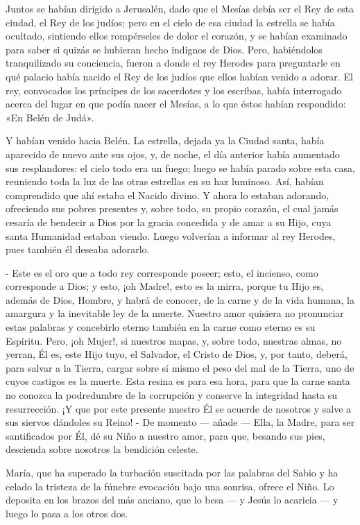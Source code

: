 \documentclass[12pt, twoside, openright]{book} %
\begin{document}
Juntos se habían dirigido a Jerusalén, dado que el Mesías debía ser el Rey de esta ciudad, el Rey de los judíos; pero en el cielo de esa ciudad la estrella se había ocultado, sintiendo ellos rompérseles de dolor el corazón, y se habían examinado para saber si quizás se hubieran hecho indignos de Dios. Pero, habiéndolos tranquilizado su conciencia, fueron a donde el rey Herodes para preguntarle en qué palacio había nacido el Rey de los judíos que ellos habían venido a adorar. El rey, convocados los príncipes de los sacerdotes y los escribas, había interrogado acerca del lugar en que podía nacer el Mesías, a lo que éstos habían respondido: «En Belén de Judá». 

Y habían venido hacia Belén. La estrella, dejada ya la Ciudad santa, había aparecido de nuevo ante sus ojos, y, de noche, el día anterior había aumentado sus resplandores: el cielo todo era un fuego; luego se había parado sobre esta casa, reuniendo toda la luz de las otras estrellas en su haz luminoso. Así, habían comprendido que ahí estaba el Nacido divino. Y ahora lo estaban adorando, ofreciendo sus pobres presentes y, sobre todo, su propio corazón, el cual jamás cesaría de bendecir a Dios por la gracia concedida y de amar a su Hijo, cuya santa Humanidad estaban viendo. Luego volverían a informar al rey Herodes, pues también él deseaba adorarlo. 

- Este es el oro que a todo rey corresponde poseer; esto, el incienso, como corresponde a Dios; y esto, ¡oh Madre!, esto es la mirra, porque tu Hijo es, además de Dios, Hombre, y habrá de conocer, de la carne y de la vida humana, la amargura y la inevitable ley de la muerte. Nuestro amor quisiera no pronunciar estas palabras y concebirlo eterno también en la carne como eterno es su Espíritu. Pero, ¡oh Mujer!, si nuestros mapas, y, sobre todo, nuestras almas, no yerran, Él es, este Hijo tuyo, el Salvador, el Cristo de Dios, y, por tanto, deberá, para salvar a la Tierra, cargar sobre sí mismo el peso del mal de la Tierra, uno de cuyos castigos es la muerte. Esta resina es para esa hora, para que la carne santa no conozca la podredumbre de la corrupción y conserve la integridad hasta su resurrección. ¡Y que por este presente nuestro Él se acuerde de nosotros y salve a sus siervos dándoles su Reino! - De momento — añade — Ella, la Madre, para ser santificados por Él, dé su Niño a nuestro amor, para que, besando sus pies, descienda sobre nosotros la bendición celeste. 

María, que ha superado la turbación suscitada por las palabras del Sabio y ha celado la tristeza de la fúnebre evocación bajo una sonrisa, ofrece el Niño. Lo deposita en los brazos del más anciano, que lo besa — y Jesús lo acaricia — y luego lo pasa a los otros dos. 
\end{document}
